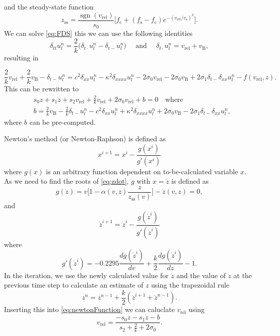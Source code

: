\documentclass{article}
\DeclareMathOperator{\sgn}{sgn}
\begin{document}
and the steady-state function
\begin{equation}
    z_\text{ss} = \frac{\sgn(v_\text{rel})}{s_0}\Big[f_\text{c}+(f_\text{s}-f_\text{c})e^{-(v_\text{rel}/v_\text{s})^2}\Big].
\end{equation}
We can solve \eqref{eq:FDS} this we can use the following identities
\begin{equation}
    \delta_{tt}u_l^n = \frac{2}{k}\big(\delta_{t\cdot}u_l^n-\delta_{t-}u_l^n\big) \quad \text{ and } \quad \delta_{t\cdot}u_l^n = v_\text{rel} + v_\text{B},
\end{equation}
resulting in 

\begin{equation}
\label{eq:stiffStringFDS}
\frac{2}{k}v_\text{rel} + \frac{2}{k}v_\text{B} - \delta_{t-}u_l^n =c^2 \delta_{xx} u_l^n -\kappa^2\delta_{xxxx} u_l^n - 2\sigma_0v_\text{rel} - 2\sigma_0v_\text{B}
+ 2\sigma_1\delta_{t-}\delta_{xx}u_l^n - f(v_\text{rel}, z).
\end{equation}
This can be rewritten to
\begin{align}\label{eq:newtonFunction}
    &s_0z+s_1\dot z+s_2v_\text{rel} + \frac{2}{k}v_\text{rel} + 2\sigma_0v_\text{rel} + b = 0 \quad \text{where} \\
    & b = \frac{2}{k}v_\text{B}-\frac{2}{k}\delta_{t-}u_l^n - c^2 \delta_{xx} u_l^n +\kappa^2\delta_{xxxx} u_l^n + 2\sigma_0v_\text{B}
- 2\sigma_1\delta_{t-}\delta_{xx}u_l^n,
\end{align}
where $b$ can be pre-computed.

Newton's method (or Newton-Raphson) is defined as
\begin{equation}
    x^{i+1} = x^{i} - \frac{g(x^i)}{g'(x^i)}
\end{equation}
where $g(x)$ is an arbitrary function dependent on to-be-calculated variable $x$.
As we need to find the roots of \eqref{eq:zdot}, $g$ with $x=\dot z$ is defined as
\begin{equation}
   g(\dot z) = v\bigg[1-\alpha(v, z)\frac{z}{z_\text{ss}(v)}\bigg] -  \dot z(v,z) = 0,
\end{equation}
and
\begin{equation}
    \dot z^{i+1} = \dot z^i - \frac{g(\dot z^i)}{g'(\dot z^i)}
\end{equation}
where
\begin{equation}
    g'(\dot z^i) = -0.2295\frac{dg(\dot z^i)}{dv} + \frac{k}{2}\frac{dg(\dot z^i)}{dz} - 1.
\end{equation}
In the iteration, we use the newly calculated value for $\dot z$ and the value of $z$ at the previous time step to calculate an estimate of $z$ using the trapezoidal rule
\begin{equation}
    z^n = z^{n-1} + \frac{k}{2}(\dot z^{i+1} + \dot z^{n-1}).
\end{equation}
Inserting this into \eqref{eq:newtonFunction} we can caluclate $v_\text{rel}$ using
\begin{equation}
    v_\text{rel} = \frac{-s_0z-s_1\dot z-b}{s_2 + \frac{2}{k} + 2\sigma_0}.
\end{equation}
\end{document}
